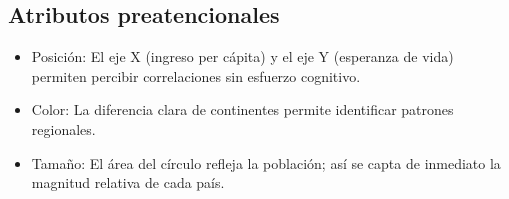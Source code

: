 \documentclass{../../../miPlantilla}
\begin{document}
\subsection{Atributos preatencionales}

\begin{itemize}
    \item Posición: El eje X (ingreso per cápita) y el eje Y (esperanza de vida) permiten percibir correlaciones sin esfuerzo cognitivo.
    \item Color: La diferencia clara de continentes permite identificar patrones regionales.
    \item Tamaño: El área del círculo refleja la población; así se capta de inmediato la magnitud relativa de cada país.
\end{itemize}
\end{document}
